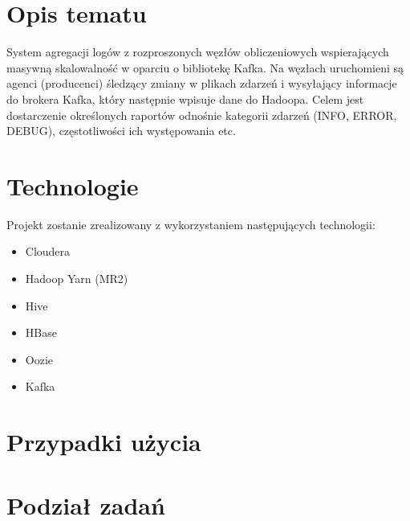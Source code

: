 \documentclass[a4paper,11pt]{article}
\begin{document}
\section{Opis tematu}
    System agregacji logów z rozproszonych węzłów obliczeniowych wspierających masywną skalowalność w oparciu o bibliotekę Kafka. Na węzłach uruchomieni są agenci (producenci) śledzący zmiany w plikach zdarzeń i wysyłający informacje do brokera Kafka, który następnie wpisuje dane do Hadoopa. Celem jest dostarczenie określonych raportów odnośnie kategorii zdarzeń (INFO, ERROR, DEBUG), częstotliwości ich występowania etc.

\section{Technologie} 
    Projekt zostanie zrealizowany z wykorzystaniem następujących technologii:
    \begin{itemize}
        \item Cloudera
        \item Hadoop Yarn (MR2)
        \item Hive
        \item HBase
        \item Oozie
        \item Kafka
    \end{itemize}

\section{Przypadki użycia}


\section{Podział zadań}
\end{document}
